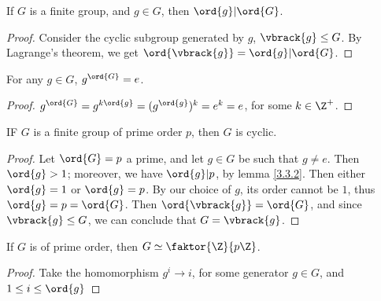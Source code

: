 \begin{lemma}\label{3.3.2}
    If $G$ is a finite group, and  $g \in G$, then  $\ord{g}|\ord{G}$.
\end{lemma}
\begin{proof}
    Consider the cyclic subgroup generated by $g$, $\vbrack{g} \leq G$. By
    Lagrange's theorem, we get $\ord{\vbrack{g}}=\ord{g}|\ord{G}$.
\end{proof}
\begin{corollary}
    For any $g \in G$,  $g^{\ord{G}}=e$.
\end{corollary}
\begin{proof}
    $g^{\ord{G}}=g^{k\ord{g}}=(g^{\ord{g}})^k=e^k=e$, for some $k \in \Z^+$.
\end{proof}

\begin{lemma}\label{3.3.3}
    IF $G$ is a finite group of prime order $p$, then $G$ is cyclic.
\end{lemma}
\begin{proof}
    Let $\ord{G}=p$ a prime, and let $g \in G$ be such that $g \neq e$. Then
    $\ord{g} > 1$; moreover, we have $\ord{g}|p$, by lemma \ref{3.3.2}. Then
    either $\ord{g}=1$ or $\ord{g}=p$. By our choice of $g$, its order cannot be
     $1$, thus  $\ord{g}=p=\ord{G}$. Then $\ord{\vbrack{g}}=\ord{G}$, and since
     $\vbrack{g} \leq G$, we can conclude that $G=\vbrack{g}$.
\end{proof}
\begin{corollary}
    If $G$ is of prime order, then  $G \simeq \faktor{\Z}{p\Z}$.
\end{corollary}
\begin{proof}
    Take the homomorphism $g^i \rightarrow i$, for some generator $g \in G$, and
     $1 \leq i \leq \ord{g}$
\end{proof}

